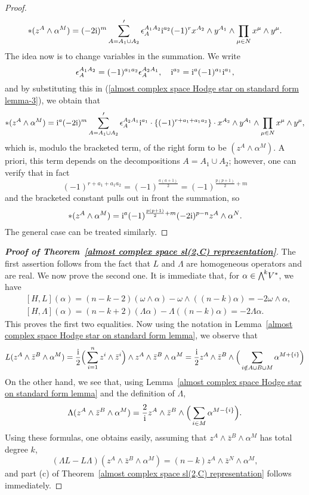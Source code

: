 \documentclass[11pt]{book}
\theoremstyle{definition}
\begin{document}
\begin{proof}
\begin{align}\label{almost complex space Hodge star on standard form lemma-3}
\ast(z^A\wedge\alpha^M)=(-2\mathrm{i})^m\sum'_{A=A_1\cup A_2}\epsilon_A^{A_1A_2}\mathrm{i}^{a_2}(-1)^rx^{A_2}\wedge y^{A_1}\wedge\prod_{\mu\in N}x^\mu\wedge y^\mu.
\end{align}
The idea now is to change variables in the summation. We write
\[\epsilon_A^{A_1A_2}=(-1)^{a_1a_2}\epsilon_A^{A_2A_1},\quad \mathrm{i}^{a_2}=\mathrm{i}^a(-1)^{a_1}\mathrm{i}^{a_1},\]
and by substituting this in (\ref{almost complex space Hodge star on standard form lemma-3}), we obtain that
\begin{align*}
\ast(z^A\wedge\alpha^M)=\mathrm{i}^a(-2\mathrm{i})^m\sum'_{A=A_1\cup A_2}\epsilon_A^{A_2A_1}\mathrm{i}^{a_1}\cdot\{(-1)^{r+a_1+a_1a_2}\}\cdot x^{A_2}\wedge y^{A_1}\wedge\prod_{\mu\in N}x^\mu\wedge y^\mu,
\end{align*}
which is, modulo the bracketed term, of the right form to be $(z^A\wedge\alpha^M)$. A priori, this term depends on the decompositions $A=A_1\cup A_2$; however, one can verify that in fact
\[(-1)^{r+a_1+a_1a_2}=(-1)^{\frac{a(a+1)}{2}}=(-1)^{\frac{p(p+1)}{2}+m}\]
and the bracketed constant pulls out in front the summation, so
\[\ast(z^A\wedge\alpha^M)=\mathrm{i}^a(-1)^{\frac{p(p+1)}{2}+m}(-2\mathrm{i})^{p-n}z^A\wedge\alpha^N.\]
The general case can be treated similarly.
\end{proof}
\begin{proof}[\textbf{Proof of Theorem~\ref{almost complex space sl(2,C) representation}}]
The first assertion follows from the fact that $L$ and $\Lambda$ are homogeneous operators and are real. We now prove the second one. It is immediate that, for $\alpha\in\bigw^kV^*$, we have
\begin{align*}
&[H,L](\alpha)=(n-k-2)(\omega\wedge\alpha)-\omega\wedge((n-k)\alpha)=-2\omega\wedge\alpha,\\
&[H,\Lambda](\alpha)=(n-k+2)(\Lambda\alpha)-\Lambda((n-k)\alpha)=-2\Lambda\alpha.
\end{align*}
This proves the first two equalities. Now using the notation in Lemma~\ref{almost complex space Hodge star on standard form lemma}, we observe that
\begin{align*}
L(z^A\wedge\bar{z}^B\wedge\alpha^M)=\frac{\mathrm{i}}{2}\Big(\sum_{i=1}^{n}z^i\wedge\bar{z}^i\Big)\wedge z^A\wedge\bar{z}^B\wedge\alpha^M=\frac{\mathrm{i}}{2}z^A\wedge\bar{z}^B\wedge\Big(\sum_{i\notin A\cup B\cup M}\alpha^{M+\{i\}}\Big)
\end{align*}
On the other hand, we see that, using Lemma~\ref{almost complex space Hodge star on standard form lemma} and the definition of $\Lambda$,
\begin{align*}
\Lambda(z^A\wedge\bar{z}^B\wedge\alpha^M)=\frac{2}{\mathrm{i}}z^A\wedge\bar{z}^B\wedge\Big(\sum_{i\in M}\alpha^{M-\{i\}}\Big).
\end{align*}
Using these formulas, one obtains easily, assuming that $z^A\wedge\bar{z}^B\wedge\alpha^M$ has total degree $k$,
\[(\Lambda L-L\Lambda)(z^A\wedge\bar{z}^B\wedge\alpha^M)=(n-k)z^A\wedge\bar{z}^N\wedge\alpha^M,\]
and part (c) of Theorem~\ref{almost complex space sl(2,C) representation} follows immediately.
\end{proof}
\end{document}
